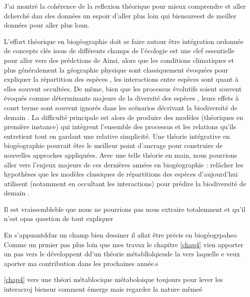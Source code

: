 J'ai montré la cohérence de la reflexion théorique pour mieux comprendre
et aller dcherché dan sles données un espoir d'aller plus loin qui
biensureest de meiller données pour aller plus loun.

L'effort théorique en biogéographie doit se faire autour être
intégration ordonnée de concepts clés issus de différents champs de
l'écologie \citep{Thuiller2013} est une clef essentielle pour aller vers
des prédctions de Ainsi, alors que les conditions climatiques et plus
généralement la géographie physique sont classiquement évoquées pour
expliquer la répartition des espèces \cite{Kearney2004}, les
interactions entre espèces sont quant à elles souvent occultées. De
même, bien que les processus évolutifs soient souvent évoqués comme
déterminants majeurs de la diversité des espèces \cite{Rosindell2011},
leurs effets à court terme sont souvent ignorés \cite{Parmesan2006} dans
les scénarios décrivant la biodiversité de demain \cite{Lavergne2010}.
La difficulté principale est alors de produire des modèles (théoriques
en première instance) qui intègrent l'ensemble des processus et les
relations qu'ils entretient \cite{Thuiller2013} tout en gardant une
relative simplicité. Une théorie intégrative en biogéographie pourrait
être le meilleur point d'ancrage pour construire de nouvelles approches
appliquées. Avec une telle théorie en main, nous pourrions aller vers
l'enjeux majeurs de ces dernières années en biogéographie : relâcher les
hypothèses que les modèles classiques de répartitions des espèces
d'aujourd'hui utilisent (notamment en occultant les interactions) pour
prédire la biodiversité de demain \cite{Guisan2011}.

Il est vraissembleble que nous ne pourrions pas nous extraire
totalemnent et qu'il n'est opas question de tout expliquer
\citep{Gravel2011a}

En s'appuantddur un champ bien dessiner il afiat être précis en
biogéogrpaheo Comme un prmier pas plus loin que mes travax le chapitre
\ref{chap4} vien apporter un pas vers le développent dd'un théorie
métabllolqieude la vers laquelle e veux aporter ma contribution dans les
prochaines année.s

\ref{chap4} vers une théori métablocique métaboloique toujours pour
lever les interacroj biensur comment émerge mais regarder la nature
mêmeé
